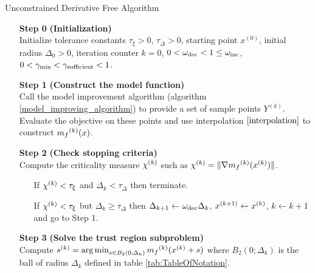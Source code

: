 \begin{algorithm}[H]
    \caption{Unconstrained Derivative Free Algorithm}
    \label{unconstrained_dfo}
    \begin{itemize}
        \item[\textbf{Step 0}] \textbf{(Initialization)} \\
            Initialize tolerance constants $\tau_{\xi} > 0$, $\tau_{\Delta} > 0$, starting point $x^{(0)}$, initial radius $\Delta_0 > 0$, iteration counter $k=0$,
            $0 < \omega_{\text{dec}} < 1 \le \omega_{\text{inc}}$, $0 < \gamma_{\text{min}} < \gamma_{\text{sufficient}} < 1$.
            
        \item[\textbf{Step 1}] \textbf{(Construct the model function)} \\
            Call the model improvement algorithm (algorithm \ref{model_improving_algorithm}) to provide a set of sample points $Y^{(k)}$.
            Evaluate the objective on these points and use interpolation $\ref{interpolation}$ to construct ${{m}_f}^{(k)}(x)$.
        
        \item[\textbf{Step 2}] \textbf{(Check stopping criteria)} \\
            Compute the criticality measure ${\chi^{(k)}}$ such as ${\chi^{(k)}} = \|\nabla{{m}_f}^{(k)}({x}^{(k)})\|$. \begin{itemize}
                \item[] If $ {\chi^{(k)}} < \tau_{\xi} $ and $\Delta_k<\tau_{\Delta}$ then terminate.
                \item[] If $ {\chi^{(k)}} < \tau_{\xi} $ but $\Delta_k\ge\tau_{\Delta}$ then  
                $\Delta_{k+1} \gets \omega_{\text{dec}}\Delta_{k}$, 
                $x^{(k+1)} \gets {x}^{(k)}$,
                $k \gets k+1$ and go to Step 1.
            \end{itemize}
        
        \item[\textbf{Step 3}] \textbf{(Solve the trust region subproblem)} \\
            Compute ${s}^{(k)} = \operatorname*{arg\,min}_{s\in B_2(0; \Delta_k)} {{m}_f}^{(k)} ({x}^{(k)} + s)$ where $B_2(0; \Delta_k)$ is the ball of radius $\Delta_k$ defined in table \ref{tab:TableOfNotation}.
            

\end{itemize}
\end{algorithm}
